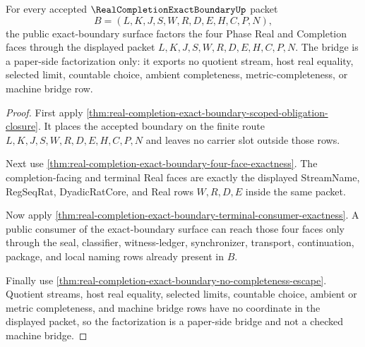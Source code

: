 \begin{theorem}
\label{thm:real-completion-exact-boundary-public-bridge-factorization}
For every accepted $\RealCompletionExactBoundaryUp$ packet
$$
B=(L,K,J,S,W,R,D,E,H,C,P,N),
$$
the public exact-boundary surface factors the four Phase Real and Completion
faces through the displayed packet $L,K,J,S,W,R,D,E,H,C,P,N$. The bridge is a
paper-side factorization only: it exports no quotient stream, host real
equality, selected limit, countable choice, ambient completeness,
metric-completeness, or machine bridge row.
\end{theorem}
\begin{proof}
First apply
\autoref{thm:real-completion-exact-boundary-scoped-obligation-closure}. It
places the accepted boundary on the finite route
$L,K,J,S,W,R,D,E,H,C,P,N$ and leaves no carrier slot outside those rows.

Next use \autoref{thm:real-completion-exact-boundary-four-face-exactness}.
The completion-facing and terminal Real faces are exactly the displayed
StreamName, RegSeqRat, DyadicRatCore, and Real rows $W,R,D,E$ inside the same
packet.

Now apply
\autoref{thm:real-completion-exact-boundary-terminal-consumer-exactness}. A
public consumer of the exact-boundary surface can reach those four faces only
through the seal, classifier, witness-ledger, synchronizer, transport,
continuation, package, and local naming rows already present in $B$.

Finally use
\autoref{thm:real-completion-exact-boundary-no-completeness-escape}. Quotient
streams, host real equality, selected limits, countable choice, ambient or
metric completeness, and machine bridge rows have no coordinate in the
displayed packet, so the factorization is a paper-side bridge and not a
checked machine bridge.
\end{proof}


